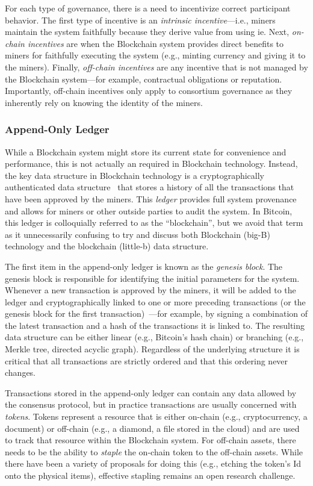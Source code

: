 For each type of governance, there is a need to incentivize correct participant behavior.
The first type of incentive is an \emph{intrinsic incentive}---i.e., miners maintain the system faithfully because they derive value from using ie.
Next, \emph{on-chain incentives} are when the Blockchain system provides direct benefits to miners for faithfully executing the system (e.g., minting currency and giving it to the miners).
Finally, \emph{off-chain incentives} are any incentive that is not managed by the Blockchain system---for example, contractual obligations or reputation.
Importantly, off-chain incentives only apply to consortium governance as they inherently rely on knowing the identity of the miners.

\subsubsection{Append-Only Ledger}
While a Blockchain system might store its current state for convenience and performance, this is not actually an required in Blockchain technology.
Instead, the key data structure in Blockchain technology is a cryptographically authenticated data structure~\cite{tamassia2003authenticated} that stores a history of all the transactions that have been approved by the miners.
This \emph{ledger} provides full system provenance and allows for miners or other outside parties to audit the system.
In Bitcoin, this ledger is colloquially referred to as the ``blockchain'', but we avoid that term as it unnecessarily confusing to try and discuss both Blockchain (big-B) technology and the blockchain (little-b) data structure.

The first item in the append-only ledger is known as the \emph{genesis block}.
The genesis block is responsible for identifying the initial parameters for the system.
Whenever a new transaction is approved by the miners, it will be added to the ledger and cryptographically linked to one or more preceding transactions (or the genesis block for the first transaction)~\cite{bayer1993improving,haber1990time,haber1997secure}---for example, by signing a combination of the latest transaction and a hash of the transactions it is linked to.
The resulting data structure can be either linear (e.g., Bitcoin's hash chain) or branching (e.g., Merkle tree, directed acyclic graph).
Regardless of the underlying structure it is critical that all transactions are strictly ordered and that this ordering never changes.

Transactions stored in the append-only ledger can contain any data allowed by the consensus protocol, but in practice transactions are usually concerned with \emph{tokens}.
Tokens represent a resource that is either on-chain (e.g., cryptocurrency, a document) or off-chain (e.g., a diamond, a file stored in the cloud) and are used to track that resource within the Blockchain system.
For off-chain assets, there needs to be the ability to \emph{staple} the on-chain token to the off-chain assets.
While there have been a variety of proposals for doing this (e.g., etching the token's Id onto the physical items), effective stapling remains an open research challenge.

